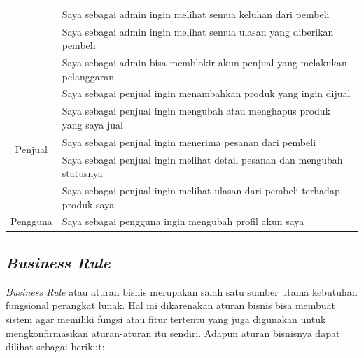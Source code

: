 \begin{table}[H]
\begin{center}
\begin{tabular}{|c| m{12cm} |}
	\cline{2-2}& {\footnotesize Saya sebagai admin ingin melihat semua keluhan dari pembeli}\\
	\cline{2-2}& {\footnotesize Saya sebagai admin ingin melihat semua ulasan yang diberikan pembeli}\\
	\cline{2-2}& {\footnotesize Saya sebagai admin bisa memblokir akun penjual yang melakukan pelanggaran}\\
	\hline
	\multirow{5}{*}{\footnotesize Penjual} & {\footnotesize Saya sebagai penjual ingin menambahkan produk yang ingin dijual}\\
	\cline{2-2}& {\footnotesize Saya sebagai penjual ingin mengubah atau menghapus produk yang saya jual}\\
	\cline{2-2}& {\footnotesize Saya sebagai penjual ingin menerima pesanan dari pembeli}\\
	\cline{2-2}& {\footnotesize Saya sebagai penjual ingin melihat detail pesanan dan mengubah statusnya}\\
	\cline{2-2}& {\footnotesize Saya sebagai penjual ingin melihat ulasan dari pembeli terhadap produk saya}\\
	\hline
	{\footnotesize Pengguna} & {\footnotesize Saya sebagai pengguna ingin mengubah profil akun saya}\\
	\hline
	\end{tabular}
	\end{center}
\end{table}

\fancyhf{} 
\fancyfoot[R]{\thepage}

\subsection{\textit{Business Rule}}



\textit{Business Rule} atau aturan bisnis merupakan salah satu sumber utama kebutuhan fungsional perangkat lunak. Hal ini dikarenakan aturan bisnis bisa membuat sistem agar memiliki fungsi atau fitur tertentu yang juga digunakan untuk mengkonfirmasikan aturan-aturan itu sendiri. Adapun aturan bisnisnya dapat dilihat sebagai berikut:

